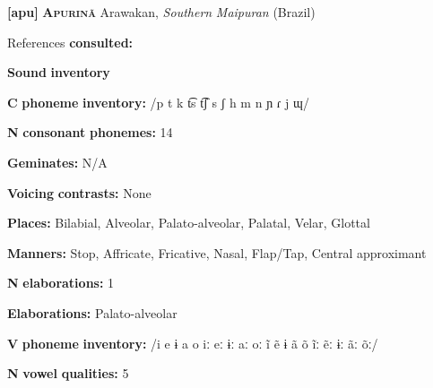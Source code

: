 \begin{styleBody}
\textbf{[apu]}   \textbf{\textsc{Apurinã}}  Arawakan, \textit{Southern} \textit{Maipuran} (Brazil)
\end{styleBody}

\begin{styleBody}
References \textbf{consulted:} \citet{Facundes2000}
\end{styleBody}

\begin{styleBody}
\textbf{Sound} \textbf{inventory}
\end{styleBody}

\begin{styleBody}
\textbf{C} \textbf{phoneme} \textbf{inventory:} /p t k t͡s t͡ʃ s ʃ h m n ɲ ɾ j ɰ/
\end{styleBody}

\begin{styleBody}
\textbf{N} \textbf{consonant} \textbf{phonemes:} 14
\end{styleBody}

\begin{styleBody}
\textbf{Geminates:} N/A
\end{styleBody}

\begin{styleBody}
\textbf{Voicing} \textbf{contrasts:} None
\end{styleBody}

\begin{styleBody}
\textbf{Places:} Bilabial, Alveolar, Palato-alveolar, Palatal, Velar, Glottal
\end{styleBody}

\begin{styleBody}
\textbf{Manners:} Stop, Affricate, Fricative, Nasal, Flap/Tap, Central approximant
\end{styleBody}

\begin{styleBody}
\textbf{N} \textbf{elaborations:} 1
\end{styleBody}

\begin{styleBody}
\textbf{Elaborations:} Palato-alveolar
\end{styleBody}

\begin{styleBody}
\textbf{V} \textbf{phoneme} \textbf{inventory:} /i e ɨ a o iː eː ɨː aː oː ĩ ẽ ɨ ã õ ĩː ẽː ɨː ãː õː/
\end{styleBody}

\begin{styleBody}
\textbf{N} \textbf{vowel} \textbf{qualities:} 5
\end{styleBody}

